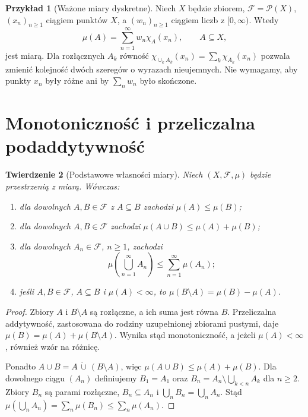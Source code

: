 \documentclass[11pt,a4paper,oneside]{book}
\numberwithin{equation}{chapter}
\theoremstyle{plain}
\newtheorem{twierdzenie}{Twierdzenie}[chapter]
\theoremstyle{definition}
\newtheorem{przyklad}[twierdzenie]{Przykład}
\theoremstyle{remark}
\begin{document}
\begin{przyklad}[Ważone miary dyskretne]
\label{ex:weighted-discrete}
Niech $X$ będzie zbiorem, $\mathcal F=\mathcal P(X)$,
$(x_n)_{n\geq1}$ ciągiem punktów $X$, a $(w_n)_{n\geq1}$
ciągiem liczb z $[0,\infty)$. Wtedy
\[
\mu(A)=\sum_{n=1}^{\infty}w_n\chi_A(x_n),
\qquad A\subseteq X,
\]
jest miarą. Dla rozłącznych $A_k$ równość
$\chi_{\cup_kA_k}(x_n)=\sum_k\chi_{A_k}(x_n)$
pozwala zmienić kolejność dwóch szeregów o wyrazach
nieujemnych. Nie wymagamy, aby punkty $x_n$ były różne ani by
$\sum_nw_n$ było skończone.
\end{przyklad}

\section{Monotoniczność i przeliczalna podaddytywność}

\begin{twierdzenie}[Podstawowe własności miary]
\label{thm:basic-measure}
Niech $(X,\mathcal F,\mu)$ będzie przestrzenią z miarą.
Wówczas:
\begin{enumerate}
\item dla dowolnych $A,B\in\mathcal F$ z $A\subseteq B$ zachodzi
$\mu(A)\leq\mu(B)$;
\item dla dowolnych $A,B\in\mathcal F$ zachodzi
$\mu(A\cup B)\leq\mu(A)+\mu(B)$;
\item dla dowolnych $A_n\in\mathcal F$, $n\geq1$, zachodzi
\begin{equation}
\label{eq:subadditivity}
\mu\left(\bigcup_{n=1}^{\infty}A_n\right)
\leq\sum_{n=1}^{\infty}\mu(A_n);
\end{equation}
\item jeśli $A,B\in\mathcal F$, $A\subseteq B$ i $\mu(A)<\infty$,
to $\mu(B\setminus A)=\mu(B)-\mu(A)$.
\end{enumerate}
\end{twierdzenie}
\begin{proof}
Zbiory $A$ i $B\setminus A$ są rozłączne, a ich suma jest równa $B$.
Przeliczalna addytywność, zastosowana do rodziny uzupełnionej
zbiorami pustymi, daje
$\mu(B)=\mu(A)+\mu(B\setminus A)$. Wynika stąd monotoniczność,
a jeżeli $\mu(A)<\infty$, również wzór na różnicę.

Ponadto $A\cup B=A\,\dot\cup\,(B\setminus A)$, więc
$\mu(A\cup B)\leq\mu(A)+\mu(B)$.
Dla dowolnego ciągu $(A_n)$ definiujemy
$B_1=A_1$ oraz
$B_n=A_n\setminus\bigcup_{k<n}A_k$ dla $n\geq2$.
Zbiory $B_n$ są parami rozłączne, $B_n\subseteq A_n$
i $\bigcup_nB_n=\bigcup_nA_n$. Stąd
$\mu(\bigcup_nA_n)=\sum_n\mu(B_n)\leq\sum_n\mu(A_n)$.
\end{proof}
\end{document}
